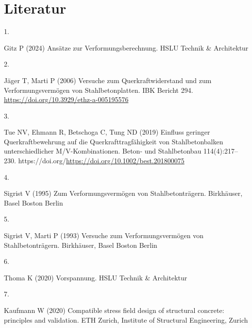 \documentclass[
  11pt,
  letterpaper,
]{scrreprt}
\newlength{\cslhangindent}
\newlength{\csllabelwidth}
\newenvironment{CSLReferences}[2] %
 {\begin{list}{}{%
  \setlength{\itemindent}{0pt}
  \setlength{\leftmargin}{0pt}
  \setlength{\parsep}{0pt}
  \ifodd #1
   \setlength{\leftmargin}{\cslhangindent}
   \setlength{\itemindent}{-1\cslhangindent}
  \fi
  \setlength{\itemsep}{#2\baselineskip}}}
 {\end{list}}
\newcommand{\CSLLeftMargin}[1]{\parbox[t]{\csllabelwidth}{\strut#1\strut}}
\newcommand{\CSLRightInline}[1]{\parbox[t]{\linewidth - \csllabelwidth}{\strut#1\strut}}
\begin{document}

\chapter*{Literatur}\label{literatur}


\label{refs}
\begin{CSLReferences}{0}{1}
\CSLLeftMargin{1. }%
\CSLRightInline{Gitz P (2024) Ansätze zur {Verformungsberechnung}. HSLU
Technik \& Architektur}

\CSLLeftMargin{2. }%
\CSLRightInline{Jäger T, Marti P (2006) Versuche zum
{Querkraftwiderstand} und zum {Verformungsvermögen} von
{Stahlbetonplatten}. IBK Bericht 294.
\url{https://doi.org/10.3929/ethz-a-005195576}}

\CSLLeftMargin{3. }%
\CSLRightInline{Tue NV, Ehmann R, Betschoga C, Tung ND (2019) Einfluss
geringer {Querkraftbewehrung} auf die {Querkrafttragfähigkeit} von
{Stahlbetonbalken} unterschiedlicher {M}/{V}-{Kombinationen}. Beton- und
Stahlbetonbau 114(4):217--230.
https://doi.org/\url{https://doi.org/10.1002/best.201800075}}

\CSLLeftMargin{4. }%
\CSLRightInline{Sigrist V (1995) Zum {Verformungsvermögen} von
{Stahlbetonträgern}. Birkhäuser, Basel Boston Berlin}

\CSLLeftMargin{5. }%
\CSLRightInline{Sigrist V, Marti P (1993) Versuche zum
{Verformungsvermögen} von {Stahlbetonträgern}. Birkhäuser, Basel Boston
Berlin}

\CSLLeftMargin{6. }%
\CSLRightInline{Thoma K (2020) Vorspannung. HSLU Technik \& Architektur}

\CSLLeftMargin{7. }%
\CSLRightInline{Kaufmann W (2020) Compatible stress field design of
structural concrete: principles and validation. ETH Zurich, Institute of
Structural Engineering, Zurich}

\end{CSLReferences}

\cleardoublepage
{}
{}
\appendix
\end{document}
